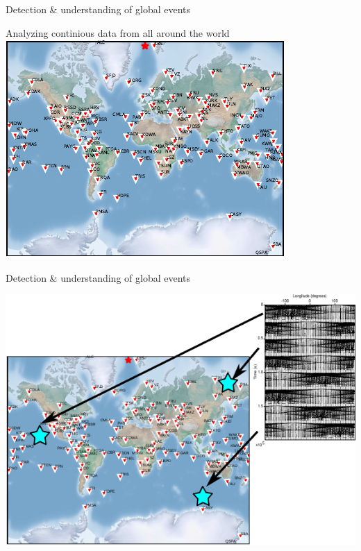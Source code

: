 \documentclass[aspectratio=43,9pt]{beamer}
\begin{document}
\begin{frame}{Detection \& understanding of global events}

   \vskip -0.3cm
   \centering Analyzing continious data from all around the world \\
   \vskip 0.2cm
   \includegraphics[width=1\linewidth]{figs/map_global}

\end{frame}



\begin{frame}{Detection \& understanding of global events}

   \includegraphics[width=1\linewidth]{figs/map_global_detect}

\end{frame}
\end{document}
